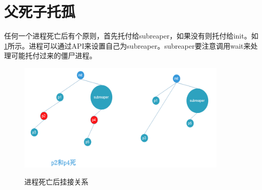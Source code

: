 \begin{tcolorbox}[colback=blue!5,colframe=blue!75!black,title=子进程死亡原因获取视频]
\end{tcolorbox}
\section{父死子托孤}
任何一个进程死亡后有个原则，首先托付给subreaper，如果没有则托付给init。如\ref{child_process_died}所示。进程可以通过API来设置自己为subreaper。subreaper要注意调用wait来处理可能托付过来的僵尸进程。
\begin{figure}[H]
 \wdfigbox
  {\caption{进程死亡后挂接关系}\label{child_process_died}}
  {
  \includegraphics[width=10cm]{./figure/child_process_died.png}
  }  
\end{figure}

\begin{tcolorbox}[colback=blue!5,colframe=blue!75!black,title=进程托孤视频]
\end{tcolorbox}
\clearpage

